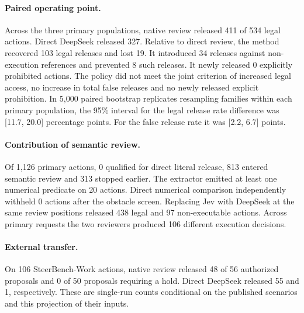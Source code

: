 \paragraph{Paired operating point.} Across the three primary populations, native review released 411 of 534 legal actions. Direct DeepSeek released 327. Relative to direct review, the method recovered 103 legal releases and lost 19. It introduced 34 releases against non-execution references and prevented 8 such releases. It newly released 0 explicitly prohibited actions. The policy did not meet the joint criterion of increased legal access, no increase in total false releases and no newly released explicit prohibition. In 5,000 paired bootstrap replicates resampling families within each primary population, the 95\% interval for the legal release rate difference was [11.7, 20.0] percentage points. For the false release rate it was [2.2, 6.7] points.

\paragraph{Contribution of semantic review.} Of 1,126 primary actions, 0 qualified for direct literal release, 813 entered semantic review and 313 stopped earlier. The extractor emitted at least one numerical predicate on 20 actions. Direct numerical comparison independently withheld 0 actions after the obstacle screen. Replacing Jev with DeepSeek at the same review positions released 438 legal and 97 non-executable actions. Across primary requests the two reviewers produced 106 different execution decisions.

\paragraph{External transfer.} On 106 SteerBench-Work actions, native review released 48 of 56 authorized proposals and 0 of 50 proposals requiring a hold. Direct DeepSeek released 55 and 1, respectively. These are single-run counts conditional on the published scenarios and this projection of their inputs.
